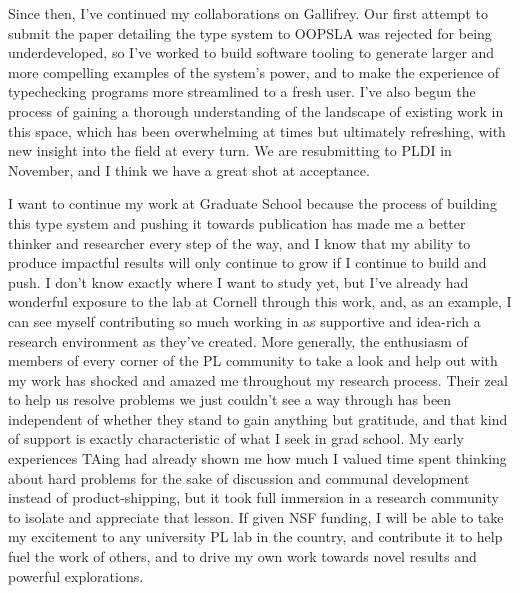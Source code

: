 \documentclass{nsf-grfp}
\begin{document}
Since then, I've continued my collaborations on Gallifrey. Our first attempt to submit the paper detailing the type system to OOPSLA was rejected for being underdeveloped, so I've worked to build software tooling to generate larger and more compelling examples of the system's power, and to make the experience of typechecking programs more streamlined to a fresh user. I've also begun the process of gaining a thorough understanding of the landscape of existing work in this space, which has been overwhelming at times but ultimately refreshing, with new insight into the field at every turn. We are resubmitting to PLDI in November, and I think we have a great shot at acceptance.

I want to continue my work at Graduate School because the process of building this type system and pushing it towards publication has made me a better thinker and researcher every step of the way, and I know that my ability to produce impactful results will only continue to grow if I continue to build and push. I don't know exactly where I want to study yet, but I've already had wonderful exposure to the lab at Cornell through this work, and, as an example, I can see myself contributing so much working in as supportive and idea-rich a research environment as they've created. More generally, the enthusiasm of members of every corner of the PL community to take a look and help out with my work has shocked and amazed me throughout my research process. Their zeal to help us resolve problems we just couldn't see a way through has been independent of whether they stand to gain anything but gratitude, and that kind of support is exactly characteristic of what I seek in grad school. My early experiences TAing had already shown me how much I valued time spent thinking about hard problems for the sake of discussion and communal development instead of product-shipping, but it took full immersion in a research community to isolate and appreciate that lesson. If given NSF funding, I will be able to take my excitement to any university PL lab in the country, and contribute it to help fuel the work of others, and to drive my own work towards novel results and powerful explorations. 
\end{document}

